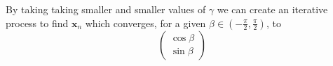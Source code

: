 By taking taking smaller and smaller values of $\gamma$ we can create an iterative process to find $\mathbf{x}_n$ which converges, for a given $\beta \in (-\frac{\pi}{2}, \frac{\pi}{2})$, to
\begin{displaymath}
	\left( \begin{array}{c}
		\cos{\beta}\\
		\sin{\beta}
	\end{array} \right)
\end{displaymath}

